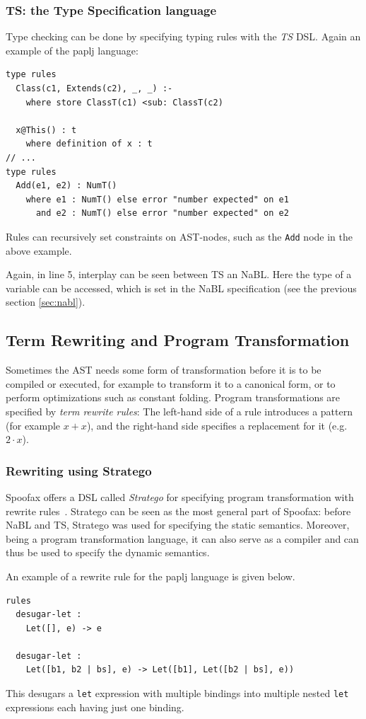 \subsubsection{TS: the Type Specification language}
\label{sec:orgheadline3}
Type checking can be done by specifying typing rules with the \emph{TS}
DSL. Again an example of the paplj language:
\lstset{language=type-spec,numbers=left}
\begin{lstlisting}
type rules
  Class(c1, Extends(c2), _, _) :-
    where store ClassT(c1) <sub: ClassT(c2)

  x@This() : t
    where definition of x : t
// ...
type rules
  Add(e1, e2) : NumT()
    where e1 : NumT() else error "number expected" on e1
      and e2 : NumT() else error "number expected" on e2
\end{lstlisting}
Rules can recursively set constraints on AST-nodes, such as the \texttt{Add}
node in the above example.

Again, in line 5, interplay can be seen between TS an NaBL. Here the
type of a variable can be accessed, which is set in the NaBL
specification (see the previous section \ref{sec:nabl}).
\subsection{Term Rewriting and Program Transformation}
\label{sec:term-rewrite}
Sometimes the AST needs some form of transformation before it is to be
compiled or executed, for example to transform it to a canonical form,
or to perform optimizations such as constant folding. Program
transformations are specified by \emph{term rewrite rules}: The left-hand
side of a rule introduces a pattern (for example \(x + x\)), and the
right-hand side specifies a replacement for it (e.g. \(2\cdot x\)).
\subsubsection{Rewriting using Stratego}
\label{sec:orgheadline4}
Spoofax offers a DSL called \emph{Stratego} for specifying program
transformation with rewrite rules~\cite{Visser01}. Stratego can be
seen as the most general part of Spoofax: before NaBL and TS, Stratego
was used for specifying the static semantics. Moreover, being a
program transformation language, it can also serve as a compiler and
can thus be used to specify the dynamic semantics.

An example of a rewrite rule for the paplj language is given below.
\lstset{language=stratego,numbers=left}
\begin{lstlisting}
rules
  desugar-let :
  	Let([], e) -> e

  desugar-let :
  	Let([b1, b2 | bs], e) -> Let([b1], Let([b2 | bs], e))
\end{lstlisting}
This desugars a \texttt{let} expression with multiple bindings into multiple
nested \texttt{let} expressions each having just one binding.

